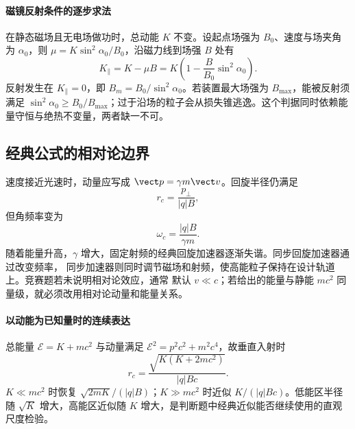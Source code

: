 \paragraph{磁镜反射条件的逐步求法}
在静态磁场且无电场做功时，总动能 $K$ 不变。设起点场强为 $B_0$、速度与场夹角为 $\alpha_0$，则
$\mu=K\sin^2\alpha_0/B_0$，沿磁力线到场强 $B$ 处有
\[
 K_\parallel=K-\mu B
 =K\left(1-\frac B{B_0}\sin^2\alpha_0\right).
\]
反射发生在 $K_\parallel=0$，即 $B_m=B_0/\sin^2\alpha_0$。若装置最大场强为 $B_{\max}$，能被反射须满足
$\sin^2\alpha_0\ge B_0/B_{\max}$；过于沿场的粒子会从损失锥逃逸。这个判据同时依赖能量守恒与绝热不变量，两者缺一不可。

\subsection*{经典公式的相对论边界}

速度接近光速时，动量应写成 $\vect p=\gamma m\vect v$。回旋半径仍满足
\begin{equation}
 r_c=\frac{p_\perp}{|q|B},
\end{equation}
但角频率变为
\begin{equation}
 \omega_c=\frac{|q|B}{\gamma m}.
\end{equation}
随着能量升高，$\gamma$ 增大，固定射频的经典回旋加速器逐渐失谐。同步回旋加速器通过改变频率，
同步加速器则同时调节磁场和射频，使高能粒子保持在设计轨道上。竞赛题若未说明相对论效应，通常
默认 $v\ll c$；若给出的能量与静能 $mc^2$ 同量级，就必须改用相对论动量和能量关系。

\paragraph{以动能为已知量时的连续表达}
总能量 $\mathcal E=K+mc^2$ 与动量满足 $\mathcal E^2=p^2c^2+m^2c^4$，故垂直入射时
\[
 r_c=\frac{\sqrt{K(K+2mc^2)}}{|q|Bc}.
\]
$K\ll mc^2$ 时恢复 $\sqrt{2mK}/(|q|B)$；$K\gg mc^2$ 时近似 $K/(|q|Bc)$。低能区半径随 $\sqrt K$ 增大，高能区近似随 $K$ 增大，是判断题中经典近似能否继续使用的直观尺度检验。

